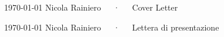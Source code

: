 \documentclass[11pt, a4paper]{awesome-cv}
\begin{document}
\makecvheader[R]

\begin{en}
\makecvfooter
  {\today}
  {Nicola Rainiero~~~·~~~Cover Letter}
  {}
\end{en}

\begin{it}
\makecvfooter
  {\today}
  {Nicola Rainiero~~~·~~~Lettera di presentazione}
  {}
\end{it}

\makelettertitle

\end{document}
